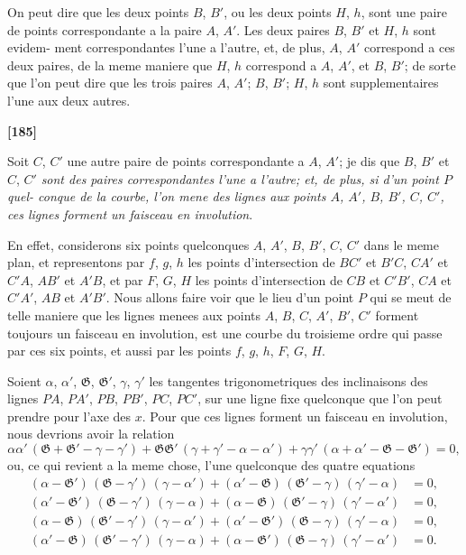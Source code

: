 \documentclass[11pt,a4paper]{article}
\begin{document}
On peut dire que les deux points $B$, $B'$, ou les deux points $H$, $h$, sont une paire
de points correspondante a la paire $A$, $A'$. Les deux paires $B$, $B'$ et $H$, $h$ sont evidem-
ment correspondantes l'une a l'autre, et, de plus, $A$, $A'$ correspond a ces deux paires,
de la meme maniere que $H$, $h$ correspond a $A$, $A'$, et $B$, $B'$; de sorte que l'on peut
dire que les trois paires $A$, $A'$; $B$, $B'$; $H$, $h$ sont supplementaires l'une aux deux autres.


\textbf{[185]}

Soit $C$, $C'$ une autre paire de points correspondante a $A$, $A'$; je dis que $B$, $B'$ et
$C$, $C'$ \textit{sont des paires correspondantes l'une a l'autre; et, de plus, si d'un point $P$ quel-
conque de la courbe, l'on mene des lignes aux points $A$, $A'$, $B$, $B'$, $C$, $C'$, ces lignes forment
un faisceau en involution}.

En effet, considerons six points quelconques $A$, $A'$, $B$, $B'$, $C$, $C'$ dans le meme plan,
et representons par $f$, $g$, $h$ les points d'intersection de $BC'$ et $B'C$, $CA'$ et $C'A$, $AB'$ et
$A'B$, et par $F$, $G$, $H$ les points d'intersection de $CB$ et $C'B'$, $CA$ et $C'A'$, $AB$ et $A'B'$.
Nous allons faire voir que le lieu d'un point $P$ qui se meut de telle maniere que les
lignes menees aux points $A$, $B$, $C$, $A'$, $B'$, $C'$ forment toujours un faisceau en involution,
est une courbe du troisieme ordre qui passe par ces six points, et aussi par les points
$f$, $g$, $h$, $F$, $G$, $H$.

Soient $\alpha$, $\alpha'$, $\mathfrak{G}$, $\mathfrak{G}'$, $\gamma$, $\gamma'$ les tangentes trigonometriques des inclinaisons des lignes
$PA$, $PA'$, $PB$, $PB'$, $PC$, $PC'$, sur une ligne fixe quelconque que l'on peut prendre pour
l'axe des $x$. Pour que ces lignes forment un faisceau en involution, nous devrions avoir
la relation
\[\alpha\alpha'\, (\mathfrak{G} + \mathfrak{G}' - \gamma - \gamma') + \mathfrak{G}\mathfrak{G}'\, (\gamma + \gamma' - \alpha - \alpha') + \gamma\gamma'\, (\alpha + \alpha' - \mathfrak{G} - \mathfrak{G}') = 0,\]
ou, ce qui revient a la meme chose, l'une quelconque des quatre equations
\begin{align*}
(\alpha - \mathfrak{G}')\, (\mathfrak{G} - \gamma')\, (\gamma - \alpha') + (\alpha' - \mathfrak{G})\, (\mathfrak{G}' - \gamma)\, (\gamma' - \alpha) &= 0,\\
(\alpha' - \mathfrak{G}')\, (\mathfrak{G} - \gamma')\, (\gamma - \alpha) + (\alpha - \mathfrak{G})\, (\mathfrak{G}' - \gamma)\, (\gamma' - \alpha') &= 0,\\
(\alpha - \mathfrak{G})\, (\mathfrak{G}' - \gamma')\, (\gamma - \alpha') + (\alpha' - \mathfrak{G}')\, (\mathfrak{G} - \gamma)\, (\gamma' - \alpha) &= 0,\\
(\alpha' - \mathfrak{G})\, (\mathfrak{G}' - \gamma')\, (\gamma - \alpha) + (\alpha - \mathfrak{G}')\, (\mathfrak{G} - \gamma)\, (\gamma' - \alpha') &= 0.
\end{align*}
\end{document}
